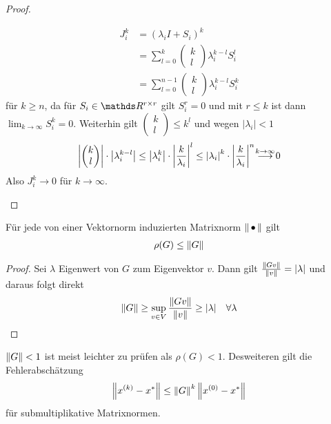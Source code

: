 \begin{Satze}[Konvergenzkriterien]
\begin{proof}
\begin{description}
\begin{align*}
  J_i^k &= (\lambda_i I+S_i)^k \\
        &= \sum_{l=0}^{k}\begin{pmatrix}k\\l\end{pmatrix}
  \lambda_i^{k-l} S_i^l\\
        &=\sum_{l=0}^{n-1} \begin{pmatrix}k\\l\end{pmatrix}
  \lambda_i^{k-l} S_i^{k}
\end{align*}
für $k\geq n$, da für $S_i\in\R^{r\times r}$ gilt $S_i^r=0$ 
und mit $r\leq k$ ist dann $\lim_{k\to\infty}S_i^k=0$.
Weiterhin gilt $\begin{pmatrix}k\\l\end{pmatrix}\leq k^l$ 
und wegen $|\lambda_i|<1$
\begin{gather*}
  \left| \begin{pmatrix}k\\l\end{pmatrix}\right|
  \cdot\left|\lambda_i^{k-l}\right|
  \leq \left|\lambda_i^{k}\right| 
  \cdot \left|\frac{k}{\lambda_i}\right|^l
  \leq \left|\lambda_i\right|^k
  \cdot \left|\frac{k}{\lambda_i}\right|^n
\overset{\mathclap{k\rightarrow \infty}}{\longrightarrow} 0
\end{gather*}
Also $J_i^k\longrightarrow 0$ für $k\longrightarrow \infty$.
  \end{description}
\end{proof}
\end{Satze}


\begin{Leme}
  Für jede von einer Vektornorm induzierten Matrixnorm 
$\nn$ gilt
\begin{gather}
  \rho(G) \leq \nn[G]
\label{IX.2.9}
\end{gather}
\begin{proof}
  Sei $\lambda$ Eigenwert von $G$ zum Eigenvektor $v$.
Dann gilt $\frac{\nn[Gv]}{\nn[v]} = |\lambda|$
und daraus folgt direkt
\begin{gather*}
  \nn[G] \geq \sup_{v\in V}\frac{\nn[Gv]}{\nn[v]}\geq |\lambda|
  \quad \forall \lambda
\end{gather*}
\end{proof}
\end{Leme}

$\nn[G]<1$ ist meist leichter zu prüfen als $\rho(G)<1$.
Desweiteren gilt die Fehlerabschätzung
\begin{gather}
   \nn[x^{(k)}-x^{*}]\leq \nn[G]^k\nn[x^{(0)}-x^{*}]
   \label{IX.2.10}
\end{gather}
für submultiplikative Matrixnormen.


